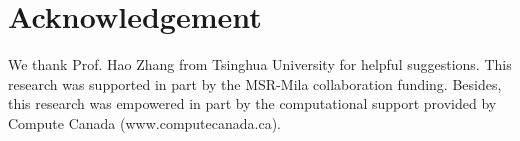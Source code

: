 \section{Acknowledgement}
We thank Prof. Hao Zhang from Tsinghua University for helpful suggestions. This research was supported in part by the MSR-Mila collaboration funding. Besides, this research was empowered in part by the computational support provided by Compute Canada (www.computecanada.ca).